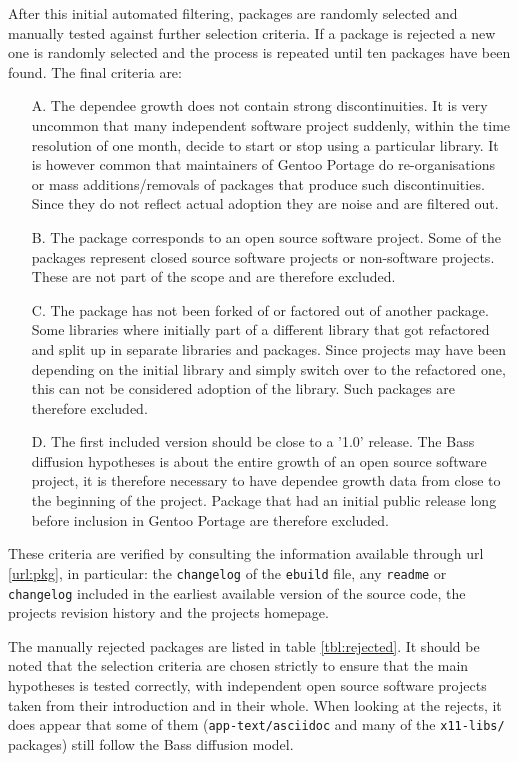 \documentclass[smallextended,final]{svjour3}
\begin{document}
After this initial automated filtering, packages are randomly selected and manually tested against further selection criteria. If a package is rejected a new one is randomly selected and the process is repeated until ten packages have been found. The final criteria are:

\begin{enumerate}
	\item[A.] The dependee growth does not contain strong discontinuities. It is very uncommon that many independent software project suddenly, within the time resolution of one month, decide to start or stop using a particular library. It is however common that maintainers of Gentoo Portage do re-organisations or mass additions/removals of packages that produce such discontinuities. Since they do not reflect actual adoption they are noise and are filtered out.
	\item[B.] The package corresponds to an open source software project. Some of the packages represent closed source software projects or non-software projects. These are not part of the scope and are therefore excluded.
	\item[C.] The package has not been forked of or factored out of another package. Some libraries where initially part of a different library that got refactored and split up in separate libraries and packages. Since projects may have been depending on the initial library and simply switch over to the refactored one, this can not be considered adoption of the library. Such packages are therefore excluded.
	\item[D.] The first included version should be close to a '1.0' release. The Bass diffusion hypotheses is about the entire growth of an open source software project, it is therefore necessary to have dependee growth data from close to the beginning of the project. Package that had an initial public release long before inclusion in Gentoo Portage are therefore excluded.
\end{enumerate}

These criteria are verified by consulting the information available through url \eqref{url:pkg}, in particular: the \texttt{changelog} of the \texttt{ebuild} file, any \texttt{readme} or \texttt{changelog} included in the earliest available version of the source code, the projects revision history and the projects homepage.

The manually rejected packages are listed in table \ref{tbl:rejected}. It should be noted that the selection criteria are chosen strictly to ensure that the main hypotheses is tested correctly, with independent open source software projects taken from their introduction and in their whole. When looking at the rejects, it does appear that some of them (\texttt{app-text/asciidoc} and many of the \texttt{x11-libs/} packages) still follow the Bass diffusion model.
\end{document}
